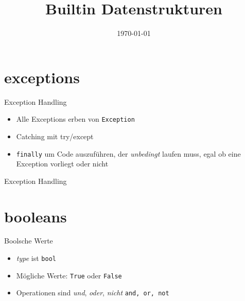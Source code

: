 \usepackage[utf8]{inputenc}

\newcommand{\topic}{
	Builtin Datenstrukturen
}

\title{\topic}
\supertitle{\course}
\date{\today}



\maketitle

\begin{frame}
	\tableofcontents
\end{frame}

\section{exceptions}
\begin{frame}{Exception Handling}
\begin{itemize}
	\item Alle Exceptions erben von \texttt{Exception}
	\item Catching mit try/except
	\item \texttt{finally} um Code auszuführen, der \textit{unbedingt} laufen muss, egal ob eine Exception vorliegt oder nicht
\end{itemize}
\end{frame}
\begin{frame}{Exception Handling}

\end{frame}

\section{booleans}
\begin{frame}{Boolsche Werte}
\begin{itemize}
	\item \textit{type} ist \texttt{bool}
	\item Mögliche Werte: \texttt{True} oder \texttt{False}
	\item Operationen sind \textit{und}, \textit{oder}, \textit{nicht} \texttt{and, or, not}
\end{itemize}
\end{frame}

